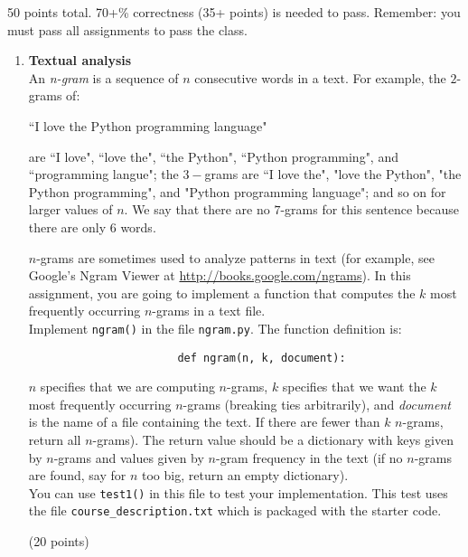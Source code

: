 \documentclass{article}
\newcounter{points}
\newcommand\setpoints[1]{\addtocounter{points}{#1}(#1 points)}
\begin{document}
\pagestyle{fancy}

50 points total.  70+\% correctness (35+ points) is needed to pass.   Remember: you must pass all assignments to pass the class. 

\begin{enumerate}
\item \textbf{Textual analysis} \\
An \emph{n-gram} is a sequence of $n$ consecutive words in a text.  For example, the $2$-grams of:
\begin{center}
 ``I love the Python programming language"
\end{center} are ``I love", ``love the", ``the Python", ``Python programming", and ``programming langue";  the $3-$grams are ``I love the", "love the Python", "the Python programming", and "Python programming language"; and so on for larger values of $n$.  We say that there are no $7$-grams for this sentence because there are only $6$ words.

$n$-grams are sometimes used to analyze patterns in text (for example, see Google's Ngram Viewer at \url{http://books.google.com/ngrams}).  In this assignment, you are going to implement a function that computes the $k$ most frequently occurring $n$-grams in a text file. \\

Implement \texttt{ngram()} in the file \texttt{ngram.py}.  The function definition is: \\

\begin{lstlisting}
                       def ngram(n, k, document):
\end{lstlisting}
$n$ specifies that we are computing $n$-grams, $k$ specifies that we want the $k$ most frequently occurring $n$-grams (breaking ties arbitrarily), and \emph{document} is the name of a file containing the text.  If there are fewer than $k$ $n$-grams, return all $n$-grams).  The return value should be a dictionary with keys given by $n$-grams and values given by $n$-gram frequency in the text  (if no $n$-grams are found, say for $n$ too big, return an empty dictionary).  \\

You can use \texttt{test1()} in this file to test your implementation.  This test uses the file \texttt{course\_description.txt} which is packaged with the starter code. \setpoints{20} \\


\end{enumerate}
\end{document}
